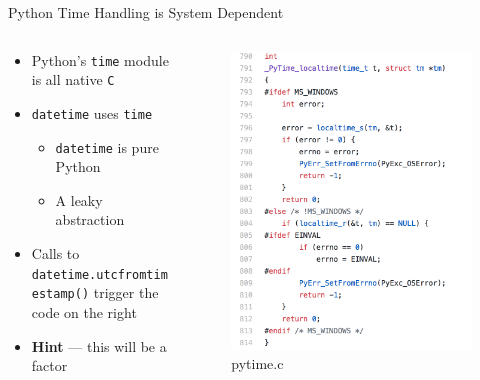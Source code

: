 \documentclass[10pt]{beamer}
\begin{document}
\begin{frame}{Python Time Handling is System Dependent}
	\begin{columns}
		\begin{column}{0.5 \textwidth}
			\begin{itemize}
				\item Python's \texttt{time} module is all native \texttt{C}
				\item \texttt{datetime} uses \texttt{time}
					\begin{itemize}
						\item \texttt{datetime} is pure Python
						\item A leaky abstraction
					\end{itemize}
				\item Calls to \texttt{datetime.utcfromtimestamp()} trigger the code on the right
				\item \textbf{Hint} --- this will be a factor
			\end{itemize}
		\end{column}
		\begin{column}{0.5 \textwidth}
			\begin{figure}
				\includegraphics[width=0.9\columnwidth]{images/rabbithole.png}
				\caption{pytime.c}
			\end{figure}
		\end{column}
	\end{columns}
\end{frame}
\end{document}
